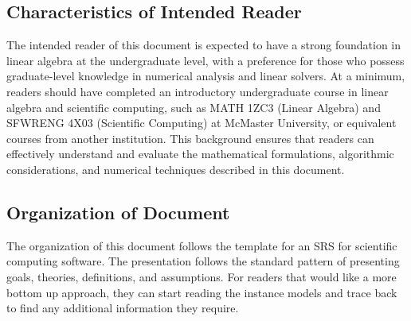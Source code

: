 \documentclass[12pt]{article}
\begin{document}
\subsection{Characteristics of Intended Reader} \label{sec_IntendedReader}



The intended reader of this document is expected to have a strong foundation in
linear algebra at the undergraduate level, with a preference for those who
possess graduate-level knowledge in numerical analysis and linear solvers. At a
minimum, readers should have completed an introductory undergraduate course in
linear algebra and scientific computing, such as MATH 1ZC3 (Linear Algebra) and
SFWRENG 4X03 (Scientific Computing) at McMaster University, or equivalent
courses from another institution. This background ensures that readers can
effectively understand and evaluate the mathematical formulations, algorithmic
considerations, and numerical techniques described in this document.

\subsection{Organization of Document}

The organization of this document follows the template for an SRS for scientific
computing software. The presentation follows the standard pattern of presenting
goals, theories, definitions, and assumptions. For readers that would like a
more bottom up approach, they can start reading the instance models and trace
back to find any additional information they require.
\end{document}
